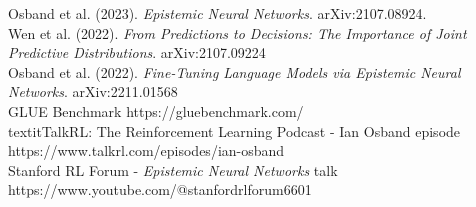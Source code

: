 \documentclass[preview]{standalone}
\begin{document}
Osband et al. (2023). \textit{Epistemic Neural Networks}. arXiv:2107.08924.\\Wen et al. (2022). \textit{From Predictions to Decisions: The Importance of Joint Predictive Distributions}. arXiv:2107.09224\\Osband et al. (2022). \textit{Fine-Tuning Language Models via Epistemic Neural Networks}. arXiv:2211.01568\\GLUE Benchmark https://gluebenchmark.com/\\textit{TalkRL: The Reinforcement Learning Podcast} - Ian Osband episode https://www.talkrl.com/episodes/ian-osband\\Stanford RL Forum - \textit{Epistemic Neural Networks} talk https://www.youtube.com/@stanfordrlforum6601\\
\end{document}
